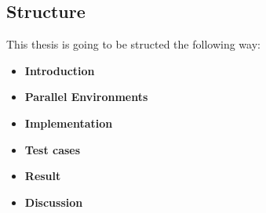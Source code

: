 \subsection{Structure}
This thesis is going to be structed the following way:

\begin{itemize}
\item{\bf{Introduction}}
\item{\bf{Parallel Environments}}
\item{\bf{Implementation}}
\item{\bf{Test cases}}
\item{\bf{Result}}
\item{\bf{Discussion}}
\end{itemize}

